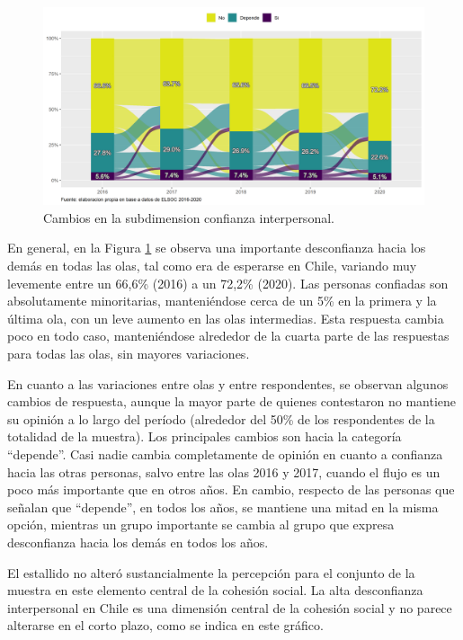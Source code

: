 \documentclass[
  12pt,
]{book}
\begin{document}
\begin{figure}[H]

{\centering \includegraphics[width=1\linewidth,height=1\textheight]{output/graphs/alluvial_conf_interpersonal} 

}

\caption{Cambios en la subdimension confianza interpersonal.}\label{fig:alluvial-conf-interpersonal}
\end{figure}

En general, en la Figura \ref{fig:alluvial-conf-interpersonal} se observa una importante desconfianza hacia los demás en todas las olas, tal como era de esperarse en Chile, variando muy levemente entre un 66,6\% (2016) a un 72,2\% (2020). Las personas confiadas son absolutamente minoritarias, manteniéndose cerca de un 5\% en la primera y la última ola, con un leve aumento en las olas intermedias. Esta respuesta cambia poco en todo caso, manteniéndose alrededor de la cuarta parte de las respuestas para todas las olas, sin mayores variaciones.

En cuanto a las variaciones entre olas y entre respondentes, se observan algunos cambios de respuesta, aunque la mayor parte de quienes contestaron no mantiene su opinión a lo largo del período (alrededor del 50\% de los respondentes de la totalidad de la muestra). Los principales cambios son hacia la categoría ``depende''. Casi nadie cambia completamente de opinión en cuanto a confianza hacia las otras personas, salvo entre las olas 2016 y 2017, cuando el flujo es un poco más importante que en otros años. En cambio, respecto de las personas que señalan que ``depende'', en todos los años, se mantiene una mitad en la misma opción, mientras un grupo importante se cambia al grupo que expresa desconfianza hacia los demás en todos los años.

El estallido no alteró sustancialmente la percepción para el conjunto de la muestra en este elemento central de la cohesión social. La alta desconfianza interpersonal en Chile es una dimensión central de la cohesión social y no parece alterarse en el corto plazo, como se indica en este gráfico.
\end{document}
